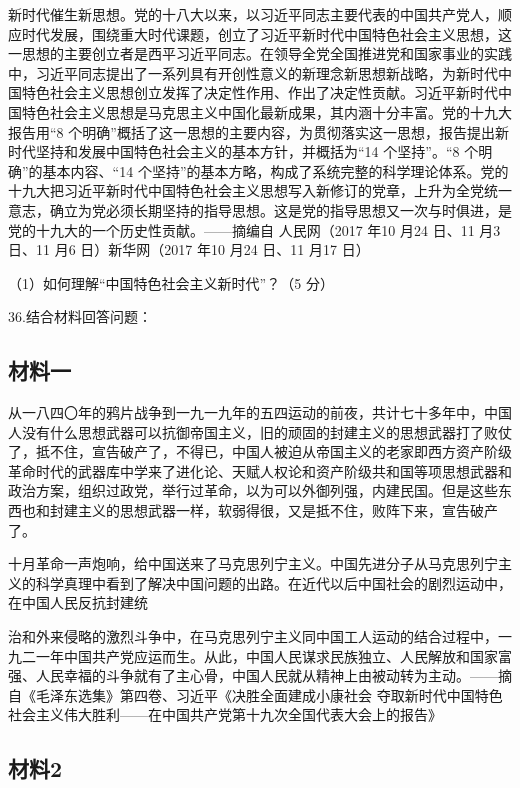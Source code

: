 \documentclass[UTF8,11pt]{ctexart}
\begin{document}
新时代催生新思想。党的十八大以来，以习近平同志主要代表的中国共产党人，顺应时代发展，围绕重大时代课题，创立了习近平新时代中国特色社会主义思想，这一思想的主要创立者是西平习近平同志。在领导全党全国推进党和国家事业的实践中，习近平同志提出了一系列具有开创性意义的新理念新思想新战略，为新时代中国特色社会主义思想创立发挥了决定性作用、作出了决定性贡献。习近平新时代中国特色社会主义思想是马克思主义中国化最新成果，其内涵十分丰富。党的十九大报告用“8 个明确”概括了这一思想的主要内容，为贯彻落实这一思想，报告提出新时代坚持和发展中国特色社会主义的基本方针，并概括为“14 个坚持”。“8 个明确”的基本内容、“14 个坚持”的基本方略，构成了系统完整的科学理论体系。党的十九大把习近平新时代中国特色社会主义思想写入新修订的党章，上升为全党统一意志，确立为党必须长期坚持的指导思想。这是党的指导思想又一次与时俱进，是党的十九大的一个历史性贡献。——摘编自 人民网（2017 年10 月24 日、11 月3 日、11 月6 日）新华网（2017 年10 月24 日、11 月17 日）

（1）如何理解“中国特色社会主义新时代”？（5 分）


36.结合材料回答问题：


\subsection*{材料一}

从一八四〇年的鸦片战争到一九一九年的五四运动的前夜，共计七十多年中，中国人没有什么思想武器可以抗御帝国主义，旧的顽固的封建主义的思想武器打了败仗了，抵不住，宣告破产了，不得已，中国人被迫从帝国主义的老家即西方资产阶级革命时代的武器库中学来了进化论、天赋人权论和资产阶级共和国等项思想武器和政治方案，组织过政党，举行过革命，以为可以外御列强，内建民国。但是这些东西也和封建主义的思想武器一样，软弱得很，又是抵不住，败阵下来，宣告破产了。


十月革命一声炮响，给中国送来了马克思列宁主义。中国先进分子从马克思列宁主义的科学真理中看到了解决中国问题的出路。在近代以后中国社会的剧烈运动中，在中国人民反抗封建统


治和外来侵略的激烈斗争中，在马克思列宁主义同中国工人运动的结合过程中，一九二一年中国共产党应运而生。从此，中国人民谋求民族独立、人民解放和国家富强、人民幸福的斗争就有了主心骨，中国人民就从精神上由被动转为主动。——摘自《毛泽东选集》第四卷、习近平《决胜全面建成小康社会 夺取新时代中国特色社会主义伟大胜利——在中国共产党第十九次全国代表大会上的报告》


\subsection*{材料2}
\end{document}
